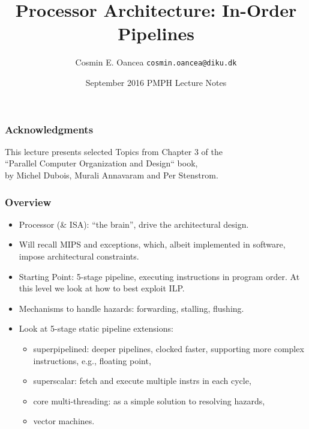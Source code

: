 \documentclass{beamer}
\title[Processor]{Processor Architecture: In-Order Pipelines}
\author[C.~Oancea]{Cosmin E. Oancea {\tt cosmin.oancea@diku.dk}}
\institute{Department of Computer Science (DIKU)\\University of Copenhagen}
\date[Sept 2016]{September 2016 PMPH Lecture Notes}
\begin{document}
\titleslide




\begin{frame}
\frametitle{Acknowledgments}
This lecture presents selected Topics from Chapter 3 of the\\
``Parallel Computer Organization and Design`` book,\\
by Michel Dubois, Murali Annavaram and Per Stenstrom.
\end{frame}

\begin{frame}[fragile,t]
\frametitle{Overview}

\begin{itemize}
    \item Processor (\& ISA): ``the brain'', drive the architectural design.\smallskip
 
    \item Will recall MIPS and exceptions, which, albeit implemented in software, 
            impose architectural constraints.\smallskip
    \item Starting Point: 5-stage pipeline, executing instructions in 
            program order. At this level we look at how to best exploit ILP.\smallskip
    \item Mechanisms to handle hazards: forwarding, stalling, flushing.\smallskip
    \item Look at 5-stage static pipeline extensions:
        \begin{itemize}
            \item superpipelined: deeper pipelines, clocked faster, supporting
                    more complex instructions, e.g., floating point,
            \item superscalar: fetch and execute multiple instrs in each cycle,
            \item core multi-threading: as a simple solution to resolving hazards,
            \item vector machines.
        \end  {itemize}
\end  {itemize}

\end{frame}
\end{document}
